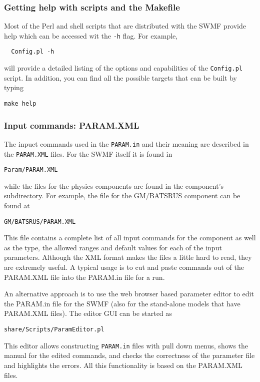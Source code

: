 \subsubsection{Getting help with scripts and the Makefile}

Most of the Perl and shell scripts that are distributed with the SWMF
provide help which can be accessed wit the {\tt -h} flag. For example, 
\begin{verbatim}
  Config.pl -h
\end{verbatim}
will provide a detailed listing of the options and capabilities of the
{\tt Config.pl} script.  In addition, you can find all the possible
targets  that can be built by typing
\begin{verbatim}
make help
\end{verbatim}

\subsubsection{Input commands: PARAM.XML}

The inpuct commands used in the {\tt PARAM.in} and their meaning are 
described in the {\tt PARAM.XML} files. For the SWMF itself it is found in
\begin{verbatim}
Param/PARAM.XML
\end{verbatim}
while the files for the physics components are found in the component's
subdirectory.  For example, the file for the GM/BATSRUS component can
be found at
\begin{verbatim}
GM/BATSRUS/PARAM.XML
\end{verbatim}
This file contains a complete list of all input commands for the
component as well as the type, the allowed ranges and default values
for each of the input parameters.
Although the XML format makes the files a little hard to read, they are
extremely useful.  A typical usage is to cut and paste commands out of the
PARAM.XML file into the PARAM.in file for a run. 

An alternative approach is to use the web browser based parameter editor 
to edit the PARAM.in file for the SWMF 
(also for the stand-alone models that have PARAM.XML files).
The editor GUI can be started as
\begin{verbatim}
share/Scripts/ParamEditor.pl
\end{verbatim}
This editor allows constructing {\tt PARAM.in} files with pull down menus, 
shows the manual for the edited commands, and checks the correctness of
the parameter file and highlights the errors. All this functionality 
is based on the PARAM.XML files.

